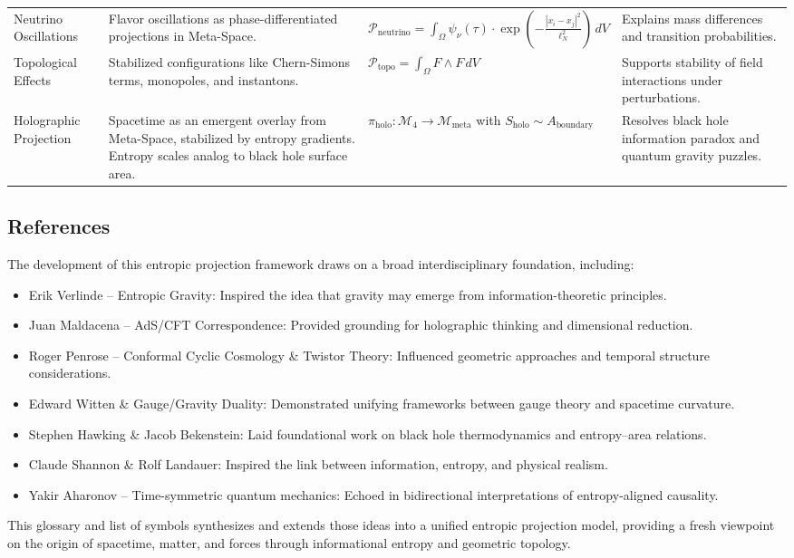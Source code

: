 \documentclass[10.5pt,a4paper]{article}
\begin{document}
{\begin{longtable}{p{3cm} p{6.5cm} p{4cm} p{4cm}}
Neutrino Oscillations & Flavor oscillations as phase-differentiated projections in Meta-Space. & \( \mathcal{P}_{\text{neutrino}} = \int_\Omega \psi_\nu(\tau) \cdot \exp\left(-\frac{|x_i - x_j|^2}{\ell_N^2}\right) \, dV \) & Explains mass differences and transition probabilities. \\

Topological Effects & Stabilized configurations like Chern-Simons terms, monopoles, and instantons. & \( \mathcal{P}_{\text{topo}} = \int_\Omega F \wedge F \, dV \) & Supports stability of field interactions under perturbations. \\

Holographic Projection & Spacetime as an emergent overlay from Meta-Space, stabilized by entropy gradients. Entropy scales analog to black hole surface area. & \( \pi_{\text{holo}}: \mathcal{M}_4 \rightarrow \mathcal{M}_{\text{meta}} \) with \( S_{\text{holo}} \sim A_{\text{boundary}} \) & Resolves black hole information paradox and quantum gravity puzzles. \\

\end{longtable}
}
\subsection{References}

The development of this entropic projection framework draws on a broad interdisciplinary foundation, including:

\begin{itemize}
    \item Erik Verlinde – Entropic Gravity: Inspired the idea that gravity may emerge from information-theoretic principles.
    \item Juan Maldacena – AdS/CFT Correspondence: Provided grounding for holographic thinking and dimensional reduction.
    \item Roger Penrose – Conformal Cyclic Cosmology \& Twistor Theory: Influenced geometric approaches and temporal structure considerations.
    \item Edward Witten \& Gauge/Gravity Duality: Demonstrated unifying frameworks between gauge theory and spacetime curvature.
    \item Stephen Hawking \& Jacob Bekenstein: Laid foundational work on black hole thermodynamics and entropy--area relations.
    \item Claude Shannon \& Rolf Landauer: Inspired the link between information, entropy, and physical realism.
    \item Yakir Aharonov – Time-symmetric quantum mechanics: Echoed in bidirectional interpretations of entropy-aligned causality.
\end{itemize}

This glossary and list of symbols synthesizes and extends those ideas into a unified entropic projection model, providing a fresh viewpoint on the origin of spacetime, matter, and forces through informational entropy and geometric topology.
\end{document}
